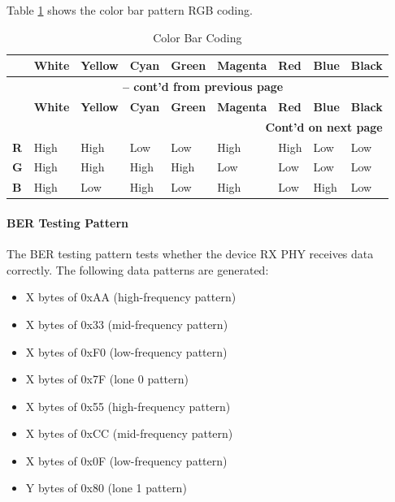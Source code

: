 \documentclass[main\_\_EN.tex]{subfiles}
\begin{document}
Table \ref{tab:color-bar-coding} shows the color bar pattern RGB coding.
\begin{longtable}[c]{ |p{0.5cm}|p{1.5cm}|p{1.5cm}|p{1.5cm}|p{1.5cm}|p{1.5cm}|p{1.5cm}|p{1.5cm}|p{1.5cm}| }
    \caption{Color Bar Coding}
    \label{tab:color-bar-coding}\\\hline

    \rowcolor{lightgray}
     & \textbf{White} & \textbf{Yellow} & \textbf{Cyan} & \textbf{Green} & \textbf{Magenta} & \textbf{Red} & \textbf{Blue} & \textbf{Black}  \\\hline
    \endfirsthead


    \multicolumn{9}{c}{\bfseries \tablename\ \thetable{} -- cont'd from previous page}\\\hline
    \rowcolor{lightgray}
    & \textbf{White} & \textbf{Yellow} & \textbf{Cyan} & \textbf{Green} & \textbf{Magenta} & \textbf{Red} & \textbf{Blue} & \textbf{Black}  \\\hline
    \endhead

    \multicolumn{9}{r}{\textbf{Cont'd on next page}} \\
    \endfoot

    \endlastfoot
        
        \textbf{R} & High & High & Low  & Low  & High & High & Low  & Low \\\hline
        \textbf{G} & High & High & High & High & Low  & Low  & Low  & Low \\\hline
        \textbf{B} & High & Low  & High & Low  & High & Low  & High & Low \\\hline

\end{longtable}

\paragraph{BER Testing Pattern}
The BER testing pattern tests whether the device RX PHY receives data correctly. The following data patterns are generated:
\begin{itemize}
    \item X bytes of 0xAA (high-frequency pattern)
    \item X bytes of 0x33 (mid-frequency pattern)
    \item X bytes of 0xF0 (low-frequency pattern)
    \item X bytes of 0x7F (lone 0 pattern)
    \item X bytes of 0x55 (high-frequency pattern)
    \item X bytes of 0xCC (mid-frequency pattern)
    \item X bytes of 0x0F (low-frequency pattern)
    \item Y bytes of 0x80 (lone 1 pattern)
\end{itemize}
\end{document}
